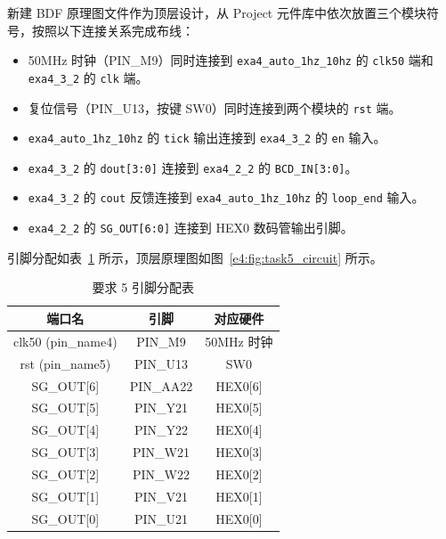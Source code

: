 \documentclass{ctexrep}
\begin{document}
新建 BDF 原理图文件作为顶层设计，从 Project 元件库中依次放置三个模块符号，按照以下连接关系完成布线：

\begin{itemize}
    \item 50MHz 时钟（PIN\_M9）同时连接到 \texttt{exa4\_auto\_1hz\_10hz} 的 \texttt{clk50} 端和 \texttt{exa4\_3\_2} 的 \texttt{clk} 端。
    \item 复位信号（PIN\_U13，按键 SW0）同时连接到两个模块的 \texttt{rst} 端。
    \item \texttt{exa4\_auto\_1hz\_10hz} 的 \texttt{tick} 输出连接到 \texttt{exa4\_3\_2} 的 \texttt{en} 输入。
    \item \texttt{exa4\_3\_2} 的 \texttt{dout[3:0]} 连接到 \texttt{exa4\_2\_2} 的 \texttt{BCD\_IN[3:0]}。
    \item \texttt{exa4\_3\_2} 的 \texttt{cout} 反馈连接到 \texttt{exa4\_auto\_1hz\_10hz} 的 \texttt{loop\_end} 输入。
    \item \texttt{exa4\_2\_2} 的 \texttt{SG\_OUT[6:0]} 连接到 HEX0 数码管输出引脚。
\end{itemize}

引脚分配如表~\ref{e4:tab:task5_pins} 所示，顶层原理图如图~\ref{e4:fig:task5_circuit} 所示。

\begin{table}[H]
    \centering
    \caption{要求 5 引脚分配表}
    \label{e4:tab:task5_pins}
    \begin{tabular}{ccc}
        \toprule
        \textbf{端口名} & \textbf{引脚} & \textbf{对应硬件} \\
        \midrule
        clk50 (pin\_name4) & PIN\_M9  & 50MHz 时钟 \\
        rst (pin\_name5)   & PIN\_U13 & SW0 \\
        SG\_OUT[6]         & PIN\_AA22 & HEX0[6] \\
        SG\_OUT[5]         & PIN\_Y21  & HEX0[5] \\
        SG\_OUT[4]         & PIN\_Y22  & HEX0[4] \\
        SG\_OUT[3]         & PIN\_W21  & HEX0[3] \\
        SG\_OUT[2]         & PIN\_W22  & HEX0[2] \\
        SG\_OUT[1]         & PIN\_V21  & HEX0[1] \\
        SG\_OUT[0]         & PIN\_U21  & HEX0[0] \\
        \bottomrule
    \end{tabular}
\end{table}
\end{document}
